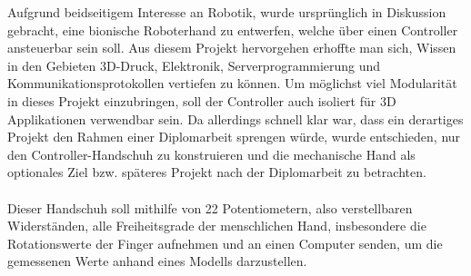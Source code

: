 Aufgrund beidseitigem Interesse an Robotik, wurde ursprünglich in Diskussion gebracht, eine bionische Roboterhand 
zu entwerfen, welche über einen Controller ansteuerbar sein soll. Aus diesem Projekt hervorgehen erhoffte man 
sich, Wissen in den Gebieten 3D-Druck, Elektronik, Serverprogrammierung und Kommunikationsprotokollen vertiefen zu können.
Um möglichst viel Modularität in dieses Projekt einzubringen, soll der Controller auch isoliert für 3D Applikationen verwendbar sein.
Da allerdings schnell klar war, dass ein derartiges Projekt den Rahmen einer Diplomarbeit sprengen würde, wurde entschieden, 
nur den Controller-Handschuh zu konstruieren und die mechanische Hand als optionales Ziel bzw. späteres Projekt nach der Diplomarbeit 
zu betrachten. 
\\\\
Dieser Handschuh soll mithilfe von 22 Potentiometern, also verstellbaren Widerständen, alle Freiheitsgrade der menschlichen Hand, insbesondere 
die Rotationswerte der Finger aufnehmen und an einen Computer senden, um die gemessenen Werte anhand eines Modells darzustellen. 